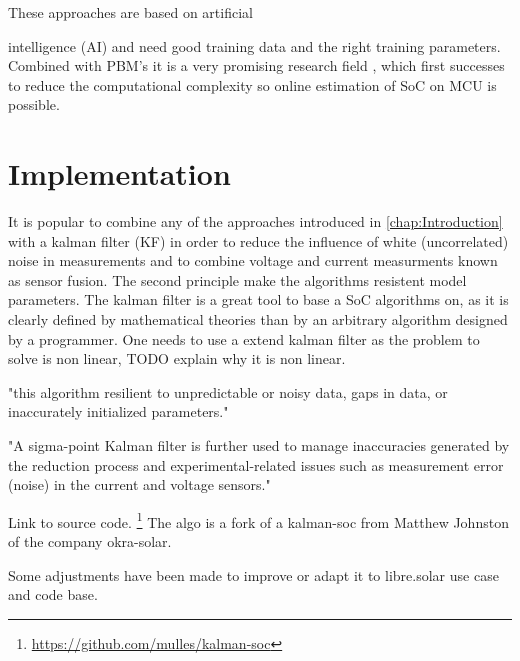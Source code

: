 These approaches are based on artificial

intelligence (AI) and need good training data and the right training parameters. Combined with PBM's it is a very promising research field \cite{9477587}, which first successes to reduce the computational complexity so online estimation of SoC on MCU is	 possible.


\chapter{Implementation}
\label{chap:Implementation}


It is popular to combine any of the approaches introduced in \ref{chap:Introduction} with a kalman filter (KF) in order to reduce the influence of white (uncorrelated) noise in measurements and to combine voltage and current measurments known as sensor fusion. The second principle make the algorithms resistent %
model parameters.  %
The kalman filter is a great tool to base a SoC algorithms on, as it is clearly defined by mathematical theories than by an arbitrary algorithm designed by a programmer. One needs to use a extend kalman filter as the problem to solve is non linear, TODO explain why it is non linear. 

"this algorithm resilient to unpredictable or noisy data, gaps in data, or inaccurately initialized parameters."

"A sigma-point Kalman filter is further used to manage inaccuracies generated by the reduction process and experimental-related issues such as measurement error (noise) in the current and voltage sensors."




Link to source code. \footnote{ \url{https://github.com/mulles/kalman-soc} } The algo is a fork of a kalman-soc from  Matthew Johnston of the company okra-solar. 

Some adjustments have been made to improve or adapt it to libre.solar use case and code base. 
 \\



